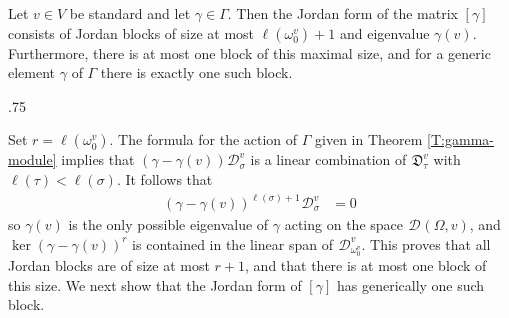 \documentclass[11pt,fleqn]{amsart}
\makeatletter
\renewcommand\proofname{Proof}
\renewenvironment{proof}[1][\textit{\proofname}]{\par
 \pushQED{\qed}%
 \normalfont \topsep.75\paraskip\relax
 \trivlist
 \item[\hskip\labelsep
 \itshape
 #1\@addpunct{.}]\ignorespaces
}{%
 \popQED\endtrivlist\@endpefalse
}
\newcounter{para}[section]
\newcommand\D[3]{{}^{#1} \mathfrak D_{#2}^{#3}}
\newcommand\DD[3]{{}^{#1} \mathcal D_{#2}^{#3}}
\makeatother
\begin{document}
\begin{Theorem}\label{thm-Jordan}
Let $v \in V$ be standard and let $\gamma \in \Gamma$. Then the Jordan form
of the matrix $[\gamma]$ consists of Jordan blocks of size at most 
$\ell(\omega_0^v)+1$ and eigenvalue $\gamma(v)$. Furthermore, there is at most
one block of this maximal size, and for a generic element $\gamma$ of $\Gamma$ there 
is exactly one such block. 
\end{Theorem}
\begin{proof}
Set $r = \ell(\omega_0^v)$.
The formula for the action of $\Gamma$ given in Theorem \ref{T:gamma-module}
implies that $(\gamma - \gamma(v)) \DD{}{\sigma}{v}$ is a linear combination of
$\D{}{\tau}{v}$ with $\ell(\tau) < \ell(\sigma)$. It follows that 
\begin{align*}
(\gamma - \gamma(v))^{\ell(\sigma) + 1} \DD{}{\sigma}{v} &= 0
\end{align*}
so $\gamma(v)$ is the only possible eigenvalue of $\gamma$ acting on the 
space $\DD{}{}{}(\Omega, v)$, and $\ker (\gamma - \gamma(v))^{r}$ is contained 
in the linear span of $\DD{}{\omega_0^v}{v}$. This proves that all Jordan
blocks are of size at most $r+1$, and that there is at most one
block of this size. We next show that the Jordan form of 
$[\gamma]$ has generically one such block.


\end{proof}
\end{document}
